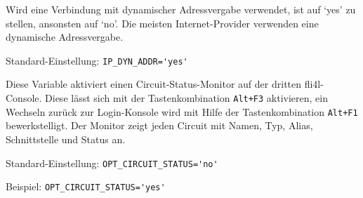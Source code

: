 \begin{description}


Wird eine Verbindung mit dynamischer Adressvergabe verwendet, ist
 auf `yes' zu stellen, ansonsten auf `no'. Die
meisten Internet-Provider verwenden eine dynamische Adressvergabe.

Standard-Einstellung: \verb+IP_DYN_ADDR='yes'+


Diese Variable aktiviert einen Circuit-Status-Monitor auf der dritten
fli4l-Console. Diese lässt sich mit der Tastenkombination \texttt{Alt+F3}
aktivieren, ein Wechseln zurück zur Login-Konsole wird mit Hilfe der
Tastenkombination \texttt{Alt+F1} bewerkstelligt. Der Monitor zeigt jeden
Circuit mit Namen, Typ, Alias, Schnittstelle und Status an.

Standard-Einstellung: \verb+OPT_CIRCUIT_STATUS='no'+

Beispiel: \verb+OPT_CIRCUIT_STATUS='yes'+

\end{description}
